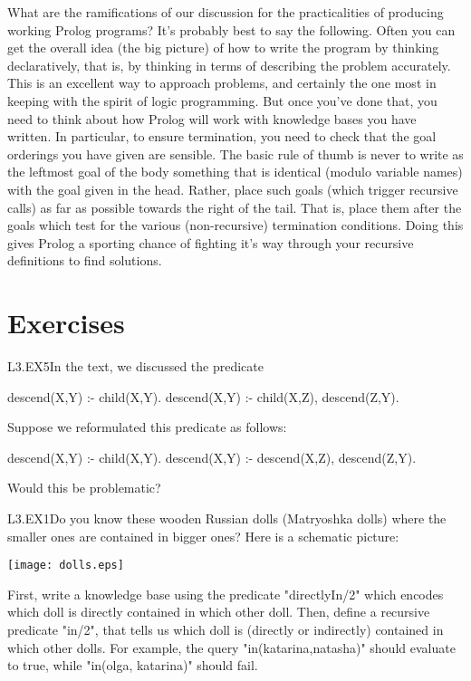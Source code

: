 What are the ramifications of our discussion for the practicalities of
producing working Prolog programs? It's probably best to say the following.
Often you can get the overall idea (the big picture) of how to write the
program by thinking declaratively, that is, by thinking in terms of describing
the problem accurately.  This is an excellent way to approach problems, and
certainly the one most in keeping with the spirit of logic programming.  But
once you've done that, you need to think about how Prolog will work with
knowledge bases you have written.  In particular, to ensure termination, you
need to check that the goal orderings you have given are sensible.  The basic
rule of thumb is never to write as the leftmost goal of the body something
that is identical (modulo variable names) with the goal given in the head.
Rather, place such goals (which trigger recursive calls) as far as possible
towards the right of the tail. That is, place them after the goals which test
for the various (non-recursive) termination conditions. Doing this gives
Prolog a sporting chance of fighting it's way through your recursive
definitions to find solutions.


\clearpage
\section{Exercises}\label{SEC.L3.EXERCISES}


\begin{LPNexercise}{L3.EX5}In the text, we discussed the predicate
\begin{LPNcodedisplay}
descend(X,Y) :- child(X,Y).
descend(X,Y) :- child(X,Z),
                 descend(Z,Y).
\end{LPNcodedisplay}
Suppose we reformulated this predicate as follows:
\begin{LPNcodedisplay}
descend(X,Y) :- child(X,Y).
descend(X,Y) :- descend(X,Z),
                 descend(Z,Y).
\end{LPNcodedisplay}
\end{LPNexercise}
Would this
be problematic?

\begin{LPNexercise}{L3.EX1}Do you know these wooden Russian dolls
(Matryoshka dolls) where the smaller ones are contained in bigger
ones?  Here is a schematic picture:

\texttt{[image: dolls.eps]}

First, write a knowledge base using the predicate "directlyIn/2" which
encodes which doll is directly contained in which other doll.  Then,
define a recursive predicate "in/2", that tells us which doll is
(directly or indirectly) contained in which other dolls. For example,
the query "in(katarina,natasha)" should evaluate to true, while
"in(olga, katarina)" should fail.
\end{LPNexercise}


